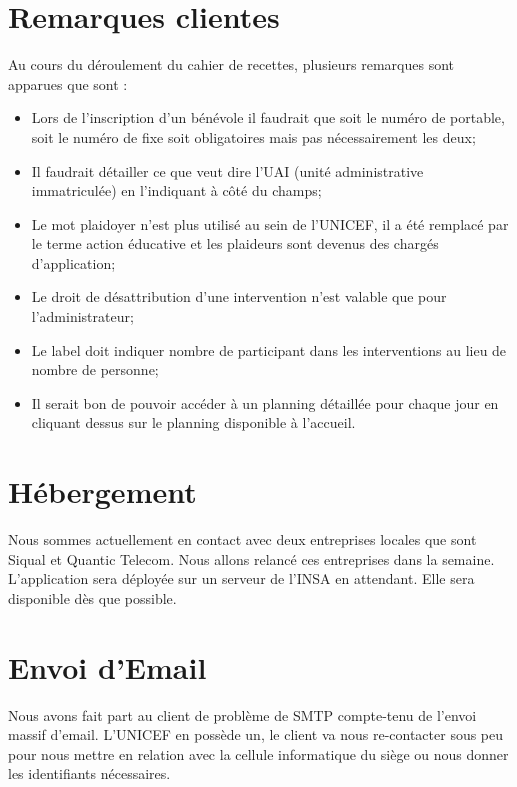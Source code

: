 \documentclass [a4paper] {article}
\begin{document}
\section{Remarques clientes}
Au cours du déroulement du cahier de recettes, plusieurs remarques sont apparues que sont : 
\begin{itemize}
	\item Lors de l'inscription d'un bénévole il faudrait que soit le numéro de portable, soit le numéro de fixe soit obligatoires mais pas nécessairement les deux;
	\item Il faudrait détailler ce que veut dire l'UAI (unité administrative immatriculée) en l'indiquant à côté du champs;
	\item Le mot plaidoyer n'est plus utilisé au sein de l'UNICEF, il a été remplacé par le terme action éducative et les plaideurs sont devenus des chargés d'application;
	\item Le droit de désattribution d'une intervention n'est valable que pour l'administrateur;
	\item Le label doit indiquer nombre de participant dans les interventions au lieu de nombre de personne;
	\item Il serait bon de pouvoir accéder à un planning détaillée pour chaque jour en cliquant dessus sur le planning disponible à l'accueil.
\end{itemize}

\section{Hébergement}
Nous sommes actuellement en contact avec deux entreprises locales que sont Siqual et Quantic Telecom. Nous allons relancé ces entreprises dans la semaine. L'application sera déployée sur un serveur de l'INSA en attendant. Elle sera disponible dès que possible.

\section{Envoi d'Email}
Nous avons fait part au client de problème de SMTP compte-tenu de l'envoi massif d'email. L'UNICEF en possède un, le client va nous re-contacter sous peu pour nous mettre en relation avec
la cellule informatique du siège ou nous donner les identifiants nécessaires.

\newpage
\end{document}
